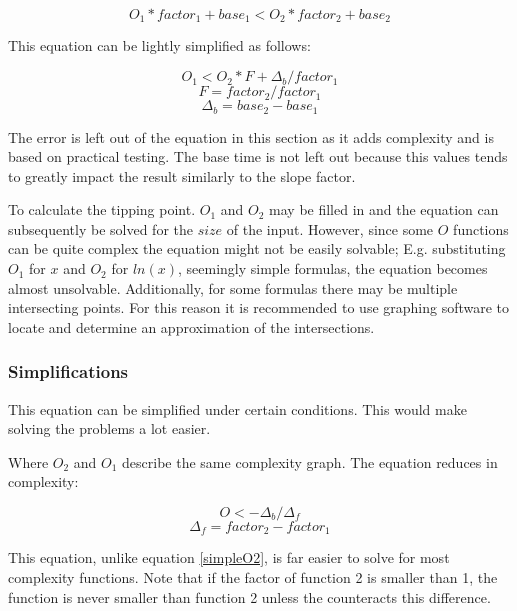\documentclass[11pt,a4paper]{report}
\begin{document}
\begin{equation}
O_1 * factor_1 + base_1 < O_2 * factor_2 + base_2
\end{equation}

This equation can be lightly simplified as follows:

\begin{equation}
O_1 < O_2 * F + \Delta_b / factor_1
\label{simpleO2}
\end{equation}
\begin{equation}
F = factor_2 / factor_1
\end{equation}
\begin{equation}
\Delta_b = base_2 - base_1
\end{equation}

The error is left out of the equation in this section as it adds complexity and is based on practical testing. The base time is not left out because this values tends to greatly impact the result similarly to the slope factor.

To calculate the tipping point. $O_1$ and $O_2$ may be filled in and the equation can subsequently be solved for the $size$ of the input. However, since some $O$ functions can be quite complex the equation might not be easily solvable; E.g. substituting $O_1$ for $x$ and $O_2$ for $ln(x)$, seemingly simple formulas, the equation becomes almost unsolvable. Additionally, for some formulas there may be multiple intersecting points. For this reason it is recommended to use graphing software to locate and determine an approximation of the intersections.

\subsubsection{Simplifications}

This equation can be simplified under certain conditions. This would make solving the problems a lot easier.

Where $O_2$ and $O_1$ describe the same complexity graph. The equation reduces in complexity:

\begin{equation}
O < -\Delta_b / \Delta_f
\end{equation}
\begin{equation}
\Delta_f = factor_2 - factor_1
\end{equation}

This equation, unlike equation \ref{simpleO2}, is far easier to solve for most complexity functions. Note that if the factor of function 2 is smaller than 1, the function is never smaller than function 2 unless the counteracts this difference.
\end{document}
